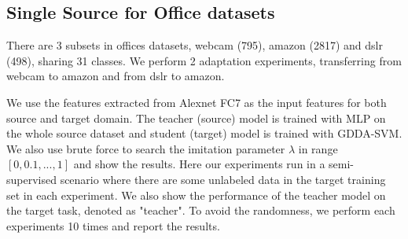 \subsection{Single Source for Office datasets}
There are 3 subsets in offices datasets, webcam (795), amazon (2817) and dslr (498), sharing 31 classes. We perform 2 adaptation experiments, transferring from webcam to amazon and from dslr to amazon. 

We use the features extracted from Alexnet \cite{KrizhevskyNIPS12} FC7 as the input features for both source and target domain. The teacher (source) model is trained with MLP on the whole source dataset and student (target) model is trained with GDDA-SVM. We also use brute force to search the imitation parameter $\lambda$ in range $[0,0.1,...,1]$ and show the results. Here our experiments run in a semi-supervised scenario where there are some unlabeled data in the target training set in each experiment. We also show the performance of the teacher model on the target task, denoted as "teacher". To avoid the randomness, we perform each experiments 10 times and report the results.
\newpage
